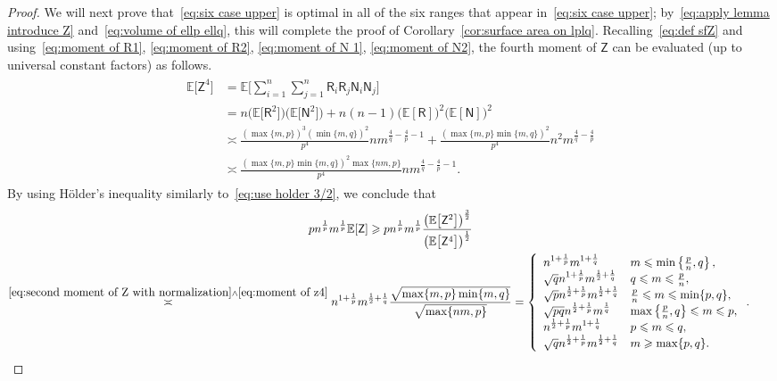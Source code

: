 \documentclass[11pt,reqno]{amsart}
\renewcommand{\le}{\leqslant}
\renewcommand{\ge}{\geqslant}
\theoremstyle{remark}
\newcommand{\E}{\mathbb{ E}}
\renewcommand{\1}{\mathbf 1}
\newcommand{\RR}{\mathsf{R}}
\newcommand{\sfZ}{\mathsf{Z}}
\newcommand{\sfN}{\mathsf{N}}
\begin{document}
\begin{proof}
We will next prove that~\eqref{eq:six case upper} is optimal in all of the six ranges that appear in~\eqref{eq:six case upper}; by~\eqref{eq:apply lemma introduce Z} and~\eqref{eq:volume of ellp ellq}, this will complete the proof of Corollary~\ref{cor:surface area on lplq}. Recalling~\eqref{eq:def sfZ}  and using~\eqref{eq:moment of R1}, \eqref{eq:moment of R2}, \eqref{eq:moment of N 1}, \eqref{eq:moment of N2}, the fourth moment of $\sfZ$ can be evaluated (up to universal constant factors) as follows.
\begin{align}\label{eq:moment of z4}
\begin{split}
\E\big[\sfZ^4\big]&=\E \bigg[\sum_{i=1}^n\sum_{j=1}^n \RR_i\RR_j\sfN_i\sfN_j\bigg]\\
&=n\big(\E\big[\RR^2\big]\big)\big(\E\big[\sfN^2\big]\big)+n(n-1)\big(\E[\RR]\big)^2\big(\E[\sfN]\big)^2\\
&\asymp \frac{(\max\{m,p\})^3(\min\{m,q\})^2}{p^4} n m^{\frac{4}{q}-\frac{4}{p}-1}
+\frac{(\max\{m,p\}\min\{m,q\})^2}{p^4}n^2 m^{\frac{4}{q}-\frac{4}{p}}\\& \asymp \frac{(\max\{m,p\}\min\{m,q\})^2\max\{nm,p\}}{p^4}n m^{\frac{4}{q}-\frac{4}{p}-1}.
\end{split}
\end{align}
By using H\"older's inequality similarly to~\eqref{eq:use holder 3/2}, we conclude that
\begin{multline*}
pn^{\frac{1}{p}}m^{\frac{1}{p}}\E[\sfZ]\ge pn^{\frac{1}{p}}m^{\frac{1}{p}}\frac{\big(\E\big[\sfZ^2\big]\big)^{\frac{3}{2}}}{\big(\E\big[\sfZ^4\big]\big)^{\frac12}}\\\stackrel{\eqref{eq:second moment of Z with normalization} \wedge \eqref{eq:moment of z4}}{\asymp} n^{1+\frac{1}{p}}m^{\frac12+\frac1{q}}\frac{\sqrt{\max\{m,p\}\min\{m,q\}}}{\sqrt{\max\{nm,p\}}}
=\left\{\begin{array}{ll}n^{1+\frac{1}{p}}m^{1+\frac{1}{q}}& m\le \min\left\{\frac{p}{n},q\right\},\\ \sqrt{q} n^{1+\frac{1}{p}} m^{\frac12+\frac{1}{q}} & q\le m\le \frac{p}{n},\\ \sqrt{p}n^{\frac12+\frac{1}{p}}m^{\frac12+\frac{1}{q}}&\frac{p}{n}\le m\le \min\{p,q\},\\\sqrt{pq} n^{\frac12+\frac{1}{p}}m^{\frac{1}{q}}
& \max\left\{\frac{p}{n},q\right\}\le m\le p,\\
n^{\frac12+\frac{1}{p}} m^{1+\frac{1}{q}}& p\le m\le q,\\
\sqrt{q} n^{\frac{1}{2}+\frac{1}{p}} m^{\frac{1}{2}+\frac{1}{q}} & m\ge\max\{p,q\}.
\end{array} \right..\tag*{\qedhere}
\end{multline*}
\end{proof}
\end{document}
